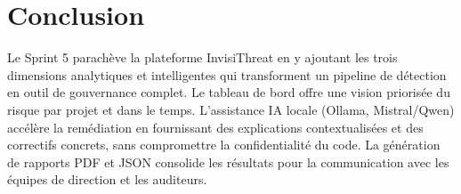 \section{Conclusion}
Le Sprint 5 parachève la plateforme InvisiThreat en y ajoutant les trois dimensions analytiques et intelligentes qui transforment un pipeline de détection en outil de gouvernance complet. Le tableau de bord offre une vision priorisée du risque par projet et dans le temps. L'assistance IA locale (Ollama, Mistral/Qwen) accélère la remédiation en fournissant des explications contextualisées et des correctifs concrets, sans compromettre la confidentialité du code. La génération de rapports PDF et JSON consolide les résultats pour la communication avec les équipes de direction et les auditeurs.
